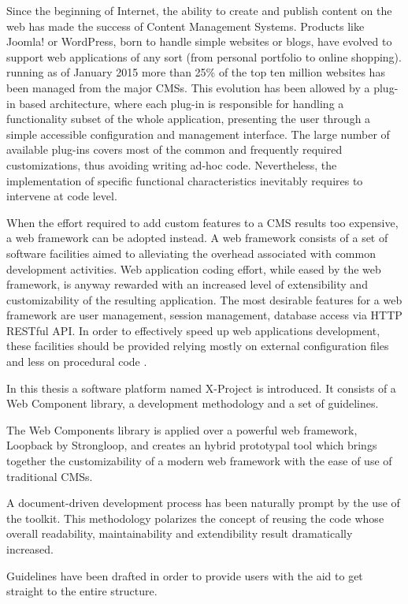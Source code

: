 Since the beginning of Internet, the ability to create and publish content on the web has made the success of Content Management Systems. Products like Joomla! or WordPress, born to handle simple websites or blogs, have evolved to support web applications of any sort (from personal portfolio to online shopping). running as of January 2015 more than 25\% of the top ten million websites \cite{cms_stats} has been managed from the major CMSs. This evolution has been allowed by a plug-in based architecture, where each plug-in is responsible for handling a functionality subset of the whole application, presenting the user through a simple accessible configuration and management interface.
The large number of available plug-ins covers most of the common and frequently required customizations, thus avoiding writing ad-hoc code. Nevertheless, the implementation of specific functional characteristics inevitably requires to intervene at code level.

When the effort required to add custom features to a CMS results too expensive, a web framework can be adopted instead. A web framework consists of a set of software facilities aimed to alleviating the overhead associated with common development activities. Web application coding effort, while eased by the web framework, is anyway rewarded with an increased level of extensibility and customizability of the resulting application.
The most desirable features for a web framework are user management, session management, database access via HTTP RESTful API. In order to effectively speed up web applications development, these facilities should be provided relying mostly on external configuration files and less on procedural code \cite{MIPRO}.

In this thesis a software platform named X-Project is introduced. It consists of a Web Component library, a development methodology and a set of guidelines.

The Web Components library is applied over a powerful web framework, Loopback by Strongloop, and creates an hybrid prototypal tool which brings together the customizability of a modern web framework with the ease of use of traditional CMSs.

A document-driven development process has been naturally prompt by the use of the toolkit. This methodology polarizes the concept of reusing the code whose overall readability, maintainability and extendibility result dramatically increased.

Guidelines have been drafted in order to provide users with the aid to get straight to the entire structure.

